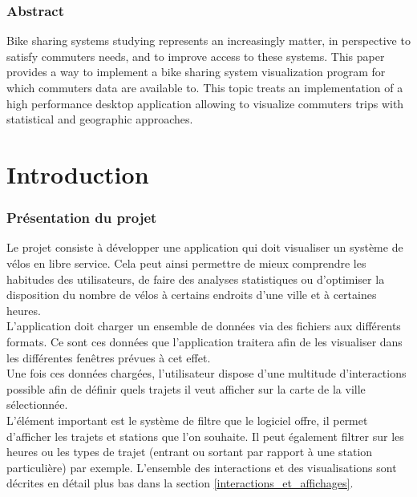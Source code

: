 \documentclass[12pt]{article}
\begin{document}
\section*{Abstract}
	Bike sharing systems studying represents an increasingly matter, in perspective to satisfy commuters needs, and to improve access to these systems. This paper provides a way to implement a bike sharing system visualization program for which commuters data are available to. This topic treats an implementation of a high performance desktop application allowing to visualize commuters trips with statistical and geographic approaches.

\newpage
\tableofcontents

\newpage
\listoffigures
	
\newpage
\part{Introduction}
	
	\section{Présentation du projet} \label{introduction}
	Le projet consiste à développer une application qui doit visualiser
	un système de vélos en libre service. Cela peut ainsi permettre de mieux comprendre les habitudes
	des utilisateurs, de faire des analyses statistiques ou d'optimiser la disposition du nombre de
	vélos à certains endroits d'une ville et à certaines heures.\\

	L’application doit charger un ensemble de données via des fichiers aux différents formats. Ce sont ces données que l'application traitera afin de les visualiser dans les différentes fenêtres prévues à cet effet.\\
	
	Une fois ces données chargées, l'utilisateur dispose d'une multitude d’interactions
	possible afin de définir quels trajets il veut afficher sur la carte de la ville sélectionnée.\\		
	L'élément important est le système de filtre que le logiciel offre, il permet d'afficher
	les trajets et stations que l’on souhaite. Il peut également filtrer sur les heures ou
	les types de trajet (entrant ou sortant par rapport à une station particulière) par exemple. L'ensemble des interactions et des visualisations sont décrites en détail plus bas
	dans la section	\ref{interactions_et_affichages}. \\
\end{document}
